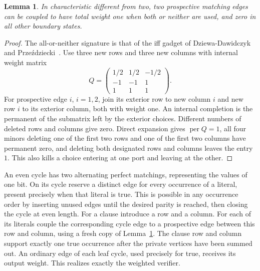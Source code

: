 \documentclass[11pt]{article}
\newtheorem{lemma}[theorem]{Lemma}
\theoremstyle{definition}
\newcommand{\per}{\operatorname{per}}
\begin{document}
\begin{lemma}\label{lem:coupler}
In characteristic different from two, two prospective matching edges can be coupled to have total weight one when both or neither are used, and zero in all other boundary states.
\end{lemma}
\begin{proof}
The all-or-neither signature is that of the iff gadget of Dziewa-Dawidczyk and Prze\'{z}dziecki~\cite[Section~2]{dziewa-przezdziecki}. Use three new rows and three new columns with internal weight matrix
\[
 Q=\begin{pmatrix}1/2&1/2&-1/2\\-1&-1&1\\1&1&1\end{pmatrix}.
\]
For prospective edge \(i\), \(i=1,2\), join its exterior row to new column \(i\) and new row \(i\) to its exterior column, both with weight one. An internal completion is the permanent of the submatrix left by the exterior choices. Different numbers of deleted rows and columns give zero. Direct expansion gives \(\per Q=1\), all four minors deleting one of the first two rows and one of the first two columns have permanent zero, and deleting both designated rows and columns leaves the entry \(1\). This also kills a choice entering at one port and leaving at the other.
\end{proof}

An even cycle has two alternating perfect matchings, representing the values of one bit. On its cycle reserve a distinct edge for every occurrence of a literal, present precisely when that literal is true. This is possible in any occurrence order by inserting unused edges until the desired parity is reached, then closing the cycle at even length. For a clause introduce a row and a column. For each of its literals couple the corresponding cycle edge to a prospective edge between this row and column, using a fresh copy of Lemma~\ref{lem:coupler}. The clause row and column support exactly one true occurrence after the private vertices have been summed out. An ordinary edge of each leaf cycle, used precisely for true, receives its output weight. This realizes exactly the weighted verifier.
\end{document}
